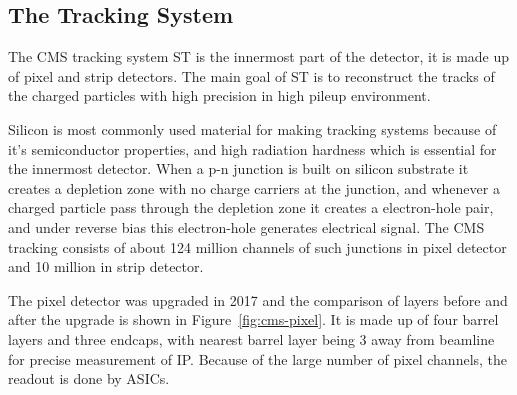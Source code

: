 \subsection{
  The Tracking System
}

The \gls{CMS} tracking system \gls{ST} is the innermost part of the detector, it
is made up of pixel and strip detectors. The main goal of \gls{ST} is to
reconstruct the tracks of the charged particles with high precision in high pileup
environment.

Silicon is most commonly used material for making tracking systems because of it's
semiconductor properties, and high radiation hardness which is essential for the
innermost detector. When a p-n junction is built on silicon substrate it creates
a depletion zone with no charge carriers at the junction, and whenever
a charged particle pass through the depletion zone it creates a electron-hole pair,
and under reverse bias this electron-hole generates electrical signal. The \gls{CMS}
tracking consists of about 124 million channels of such junctions in
pixel detector and 10 million in strip detector.

The pixel detector was upgraded in 2017 and the comparison of layers before
and after the upgrade is shown in Figure~\ref{fig:cms-pixel}. It is made up of
four barrel layers and three endcaps, with nearest barrel layer being 3\cm{}
away from beamline for precise measurement of \gls{IP}.
Because of the large number of pixel channels, the readout is done by \glspl{ASIC}.

